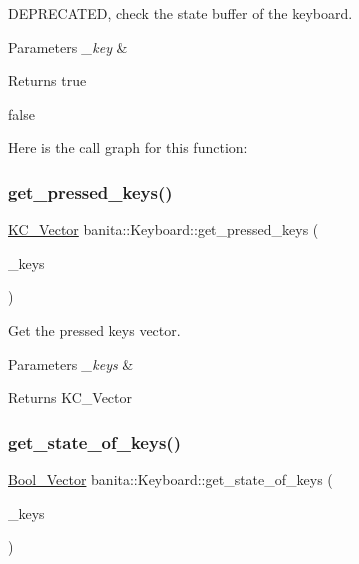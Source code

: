 D\+E\+P\+R\+E\+C\+A\+T\+ED, check the state buffer of the keyboard. 


\begin{DoxyParams}{Parameters}
{\em \+\_\+key} & \\
\hline
\end{DoxyParams}
\begin{DoxyReturn}{Returns}
true 

false 
\end{DoxyReturn}
Here is the call graph for this function\+:
\mbox{\label{classbanita_1_1_keyboard_a86160c6cee9390a757e4207feb6d082b}} 
\subsubsection{\texorpdfstring{get\_pressed\_keys()}{get\_pressed\_keys()}}
{\footnotesize\ttfamily \mbox{\hyperlink{classbanita_1_1_keyboard_ac39ec62a0a07ee3e90cc742b6b2ecb97}{K\+C\+\_\+\+Vector}} banita\+::\+Keyboard\+::get\+\_\+pressed\+\_\+keys (\begin{DoxyParamCaption}\item[{\mbox{\hyperlink{classbanita_1_1_keyboard_ac39ec62a0a07ee3e90cc742b6b2ecb97}{K\+C\+\_\+\+Vector}} \&}]{\+\_\+keys }\end{DoxyParamCaption})}



Get the pressed keys vector. 


\begin{DoxyParams}{Parameters}
{\em \+\_\+keys} & \\
\hline
\end{DoxyParams}
\begin{DoxyReturn}{Returns}
K\+C\+\_\+\+Vector 
\end{DoxyReturn}
\mbox{\label{classbanita_1_1_keyboard_afa10793b2c2bfe8ab32afe8a6d573e5e}} 
\subsubsection{\texorpdfstring{get\_state\_of\_keys()}{get\_state\_of\_keys()}}
{\footnotesize\ttfamily \mbox{\hyperlink{classbanita_1_1_keyboard_a0bd55b31db3e776ec4c8a2effc5b3cd8}{Bool\+\_\+\+Vector}} banita\+::\+Keyboard\+::get\+\_\+state\+\_\+of\+\_\+keys (\begin{DoxyParamCaption}\item[{std\+::vector$<$ \mbox{\hyperlink{classbanita_1_1_keyboard_a0dee214e6cb4f246866603b85568b9ab}{Key\+\_\+\+Code}} $>$ \&}]{\+\_\+keys }\end{DoxyParamCaption})}



